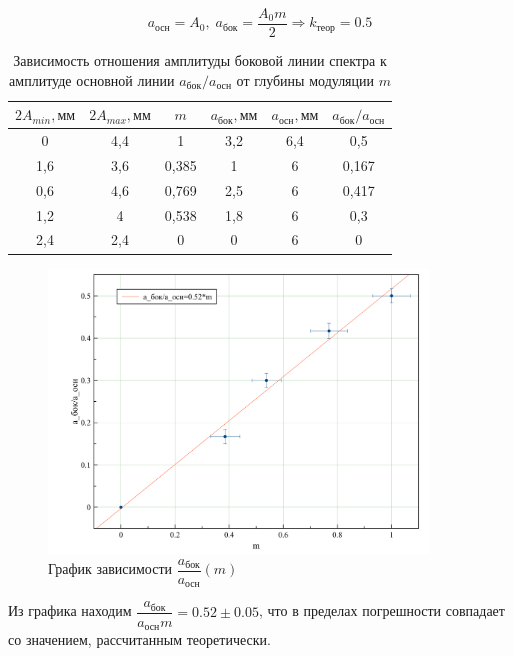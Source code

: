 \documentclass[a4paper, 12pt]{article}
\begin{document}
$$a_\text{осн} = A_0, \; a_\text{бок}= \frac{A_0m}{2} \Rightarrow k_\text{теор} = 0.5$$
	
\begin{table}[H]
\centering
\caption{Зависимость отношения амплитуды боковой линии спектра к амплитуде основной линии $a_\text{бок}/a_\text{осн}$ от глубины модуляции $m$}
\begin{tabular}{|c|c|c|c|c|c|}
\hline
$2A_{min}, \text{мм}$ & $2A_{max}, \text{мм}$ & $m$  & $a_\text{бок}, \text{мм}$ & $a_\text{осн}, \text{мм}$ & $a_\text{бок}/a_\text{осн}$ \\ \hline
0&	4,4&	1	&3,2	&6,4	&0,5 \\ \hline
1,6&	3,6&	0,385	&1	&6	&0,167 \\ \hline
0,6&	4,6&	0,769	&2,5	&6	&0,417 \\ \hline
1,2&	4&	0,538	&1,8	&6	&0,3 \\ \hline
2,4&	2,4&	0&	0&	6&	0 \\ \hline
\end{tabular}
\end{table}

\begin{figure}[H]
\centering
\includegraphics[width = 0.9\textwidth]{Plot_C}
\caption{График зависимости $\dfrac{a_\text{бок}}{a_\text{осн}}(m)$}
\end{figure}

Из графика находим $\dfrac{a_\text{бок}}{a_\text{осн} m} = 0.52 \pm 0.05$, что в пределах погрешности совпадает со значением, рассчитанным теоретически.
\end{document}
